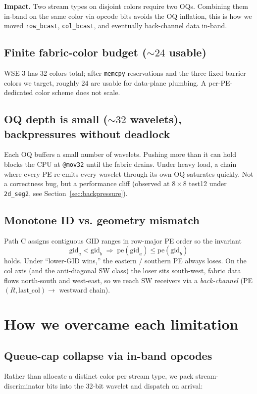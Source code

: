 \documentclass[11pt]{article}
\newcommand{\code}[1]{\texttt{#1}}
\begin{document}
\textbf{Impact.} Two stream types on disjoint colors require two
OQs. Combining them in-band on the same color via opcode bits
avoids the OQ inflation, this is how we moved
\code{row\_bcast}, \code{col\_bcast}, and eventually back-channel
data in-band.

\subsection{Finite fabric-color budget ($\sim 24$ usable)}
WSE-3 has 32 colors total; after \code{memcpy} reservations and
the three fixed barrier colors we target, roughly 24 are usable
for data-plane plumbing. A per-PE-dedicated color scheme does
not scale.

\subsection{OQ depth is small ($\sim 32$ wavelets), backpressures without deadlock}
Each OQ buffers a small number of wavelets. Pushing more than it
can hold blocks the CPU at \code{@mov32} until the fabric drains.
Under heavy load, a chain where every PE re-emits every wavelet
through its own OQ saturates quickly. Not a correctness bug, but a
performance cliff (observed at $8\times 8$ test12 under
\code{2d\_seg2}, see Section~\ref{sec:backpressure}).

\subsection{Monotone ID vs. geometry mismatch}
Path C assigns contiguous GID ranges in row-major PE order so the
invariant
\[
\mathrm{gid}_a < \mathrm{gid}_b \;\Rightarrow\;
\mathrm{pe}(\mathrm{gid}_a) \le \mathrm{pe}(\mathrm{gid}_b)
\]
holds. Under ``lower-GID wins,'' the eastern / southern PE always
loses. On the col axis (and the anti-diagonal SW class) the loser
sits south-west, fabric data flows north-south and west-east,
so we reach SW receivers via a \emph{back-channel}
(PE$(R, \mathrm{last\_col}) \to$ westward chain).

\section{How we overcame each limitation}

\subsection{Queue-cap collapse via in-band opcodes}
Rather than allocate a distinct color per stream type, we pack
stream-discriminator bits into the 32-bit wavelet and dispatch
on arrival:
\end{document}
